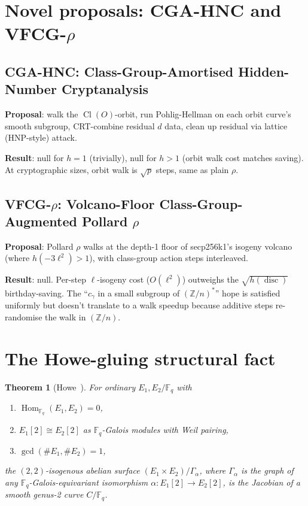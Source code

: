 \documentclass[11pt,a4paper]{article}
\newtheorem{theorem}{Theorem}[section]
\theoremstyle{definition}
\newcommand{\FF}{\mathbb{F}}
\newcommand{\ZZ}{\mathbb{Z}}
\newcommand{\Hom}{\operatorname{Hom}}
\newcommand{\Cl}{\operatorname{Cl}}
\newcommand{\disc}{\operatorname{disc}}
\renewcommand{\gcd}{\operatorname{gcd}}
\begin{document}
\section{Novel proposals: CGA-HNC and VFCG-$\rho$}\label{sec:novel}

\subsection{CGA-HNC: Class-Group-Amortised Hidden-Number Cryptanalysis}

\textbf{Proposal}: walk the $\Cl(O)$-orbit, run Pohlig-Hellman on
each orbit curve's smooth subgroup, CRT-combine residual $d$ data,
clean up residual via lattice (HNP-style) attack.

\textbf{Result}: null for $h = 1$ (trivially), null for $h > 1$
(orbit walk cost matches saving). At cryptographic sizes, orbit
walk is $\sqrt{p}$ steps, same as plain $\rho$.

\subsection{VFCG-$\rho$: Volcano-Floor Class-Group-Augmented Pollard $\rho$}

\textbf{Proposal}: Pollard $\rho$ walks at the depth-1 floor of
secp256k1's isogeny volcano (where $h(-3\ell^2) > 1$), with
class-group action steps interleaved.

\textbf{Result}: null. Per-step $\ell$-isogeny cost ($O(\ell^2)$)
outweighs the $\sqrt{h(\disc)}$ birthday-saving. The
``$c_\gamma$ in a small subgroup of $(\ZZ/n)^*$'' hope is satisfied
uniformly but doesn't translate to a walk speedup because additive
steps re-randomise the walk in $(\ZZ/n)$.

\section{The Howe-gluing structural fact}\label{sec:howe}

\begin{theorem}[Howe~\cite{howe1996}]\label{thm:howe}
For ordinary $E_1, E_2/\FF_q$ with
\begin{enumerate}[label=\textbf{(H\arabic*)}]
\item $\Hom_{\FF_q}(E_1, E_2) = 0$,
\item $E_1[2] \cong E_2[2]$ as $\FF_q$-Galois modules with Weil
      pairing,
\item $\gcd(\#E_1, \#E_2) = 1$,
\end{enumerate}
the $(2,2)$-isogenous abelian surface $(E_1 \times E_2)/\Gamma_\alpha$,
where $\Gamma_\alpha$ is the graph of any
$\FF_q$-Galois-equivariant isomorphism
$\alpha\colon E_1[2] \to E_2[2]$, is the Jacobian of a smooth
genus-2 curve $C/\FF_q$.
\end{theorem}
\end{document}
